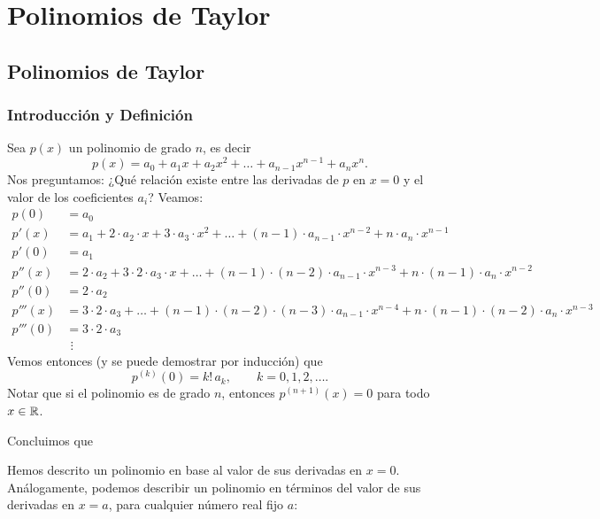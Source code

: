 
\chapter{Polinomios de Taylor}


\section{Polinomios de Taylor}

\subsection{Introducción y Definición}

Sea $p(x)$ un polinomio de grado $n$, es decir
\[
 p(x) = a_0 + a_1 x + a_2 x^2 + \dots + a_{n-1} x^{n-1} + a_n x^n.
\]
Nos preguntamos: ¿Qué relación existe entre las derivadas de $p$ en $x = 0$ y el valor de los coeficientes $a_i$?
Veamos:
\begin{align*}
 p(0)   &= a_0 \\
 p'(x)  &= a_1 + 2 \cdot a_2 \cdot x + 3 \cdot a_3 \cdot x^2 + \dots + (n-1) \cdot a_{n-1} \cdot x^{n-2} + n \cdot a_n \cdot x^{n-1} \\
 p'(0)  &= a_1 \\
 p''(x) &= 2 \cdot a_2 + 3 \cdot 2 \cdot a_3 \cdot x + \dots + (n-1) \cdot (n-2) \cdot a_{n-1} \cdot x^{n-3} + n \cdot (n-1) \cdot a_n \cdot x^{n-2} \\
 p''(0) &= 2 \cdot a_2 \\
 p'''(x) &= 3\cdot 2 \cdot a_3 + \dots + (n-1) \cdot (n-2) \cdot (n-3) \cdot a_{n-1} \cdot x^{n-4} + n \cdot (n-1) \cdot (n-2) \cdot a_n \cdot x^{n-3} \\
 p'''(0) &= 3 \cdot 2 \cdot a_3 \\
&\ \,\vdots
\end{align*}
Vemos entonces (y se puede demostrar por inducción) que
\[
 p^{(k)} (0) = k! \, a_k,\qquad k=0,1,2,\dots.
\]
Notar que si el polinomio es de grado $n$, entonces $p^{(n+1)}(x) = 0$ para todo $x \in \mathbb{R}$.

Concluimos que


Hemos descrito un polinomio en base al valor de sus derivadas en $x=0$.
Análogamente, podemos describir un polinomio en términos del valor de sus derivadas en $x=a$, para cualquier número real fijo $a$:

